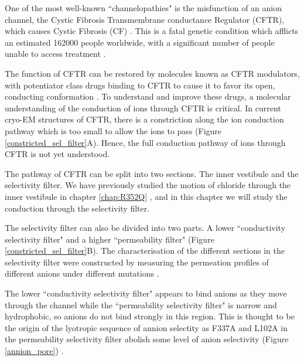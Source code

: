 One of the most well-known ``channelopathies" is the misfunction of an anion channel, the Cystic Fibrosis Transmembrane conductance Regulator (CFTR), which causes Cystic Fibrosis (CF) \cite{riordan1989,gadsby2006}. This is a fatal genetic condition which afflicts an estimated 162000 people worldwide, with a significant number of people unable to access treatment \cite{guo2022}.

The function of CFTR can be restored by molecules known as CFTR modulators, with potentiator class drugs binding to CFTR to cause it to favor its open, conducting conformation \cite{liu2019}. To understand and improve these drugs, a molecular understanding of the conduction of ions through CFTR is critical. In current cryo-EM structures of CFTR, there is a constriction along the ion conduction pathway which is too small to allow the ions to pass \cite{zhang2018} (Figure \ref{constricted_sel_filter}A). Hence, the full conduction pathway of ions through CFTR is not yet understood.

The pathway of CFTR can be split into two sections. The inner vestibule and the selectivity filter. We have previously studied the motion of chloride through the inner vestibule in chapter \ref{chap:R352Q} \cite{wong2022a}, and in this chapter we will study the conduction through the selectivity filter. 

The selectivity filter can also be divided into two parts. A lower ``conductivity selectivity filter" and a higher ``permeability filter" (Figure \ref{constricted_sel_filter}B). The characterisation of the different sections in the selectivity filter were constructed by measuring the permeation profiles of different anions under different mutations \cite{linsdell2016}. 

The lower ``conductivity selectivity filter" appears to bind anions as they move through the channel while the ``permeability selectivity filter" is narrow and hydrophobic, so anions do not bind strongly in this region. This is thought to be the origin of the lyotropic sequence of annion selectity as F337A and L102A in the permeability selectivity filter abolish some level of anion selectivity (Figure \ref{annion_pore}) \cite{linsdell2021}. 

